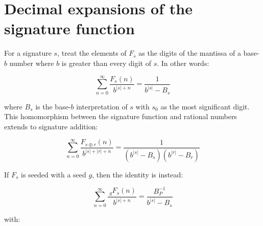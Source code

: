 \documentclass{article}
\begin{document}
\iffalse
\noindent If the length of $d$ varies and $b=1$, then we have:

\begin{align*}
s_0 &= \sum_{k=0}^{\infty} d_{2k}\\
s_1 &= \sum_{k=0}^{\infty} d_{2k+1}\\
B(S(M_d, 2), 1)(k) &= \frac{(s_0 + s_1)^k + (s_0 - s_1)^k}{2}\\
\end{align*}
\fi

\iffalse
Then the following identities exist:

$$F^{-1}_{B(S(M_{1, 1, 1}, 2), b)} = b \cdot B(S(M_{1, 1, 1}, 2), b-1) \cdot \left(1 - x(b-1) - x^2(b-2) \sum_{k=0}^{\infty} (b+1)^k x^k \right) + 1$$

$$B(S(M_{1, 1, 2}, 2), b)(k) = \frac{(b+2+\sqrt{b})^k + (b+2-\sqrt{b})^k}{2} $$

$$B(S(M_{1,2,1}, 2), b) = (1 - (b+1)x) F_{2(b+1) - x(b-1)^2}$$

$$B(S(M_{1,2,2}, 2), b)(k) = \frac{(b + 2 + 2 \sqrt{b})^k + (b + 2 - 2 \sqrt{b})^k}{2}$$

$$B(S(M_{2,1,1}, 2), b)(k) = \frac{(2b + 1 + \sqrt{b})^k + (2b + 1 - \sqrt{b})^k}{2}$$
\fi

\section{Decimal expansions of the signature function}

For a signature $s$, treat the elements of $F_s$ as the digits of the mantissa of a base-$b$ number where $b$ is greater than every digit of $s$. In other words:

$$\sum_{n=0}^{\infty} \frac{F_s(n)}{b^{|s| + n}} = \frac{1}{b^{|s|} - B_s}$$

\noindent where $B_s$ is the base-$b$ interpretation of $s$ with $s_0$ as the most significant digit. This homomorphism between the signature function and rational numbers extends to signature addition:

$$\sum_{n=0}^{\infty} \frac{F_{s \oplus r}(n)}{b^{|s| + |r| + n}} = \frac{1}{(b^{|s|} - B_s)(b^{|r|} - B_r)}$$

\noindent If $F_s$ is seeded with a seed $g$, then the identity is instead:

$$\sum_{n=0}^{\infty} \frac{~_g F_s(n)}{b^{|s| + n}} = \frac{B_P^{-1}}{b^{|s|} - B_s}$$

\noindent with:
\end{document}
